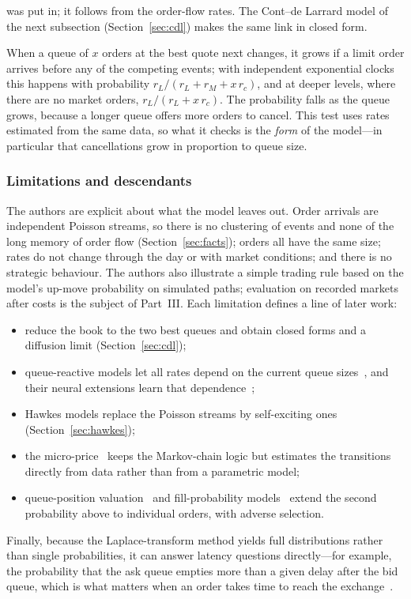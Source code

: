 \begin{description}[leftmargin=1.5em,style=nextline,itemsep=3pt]
  was put in; it follows from the order-flow rates. The Cont--de Larrard model of the next subsection
  (Section~\ref{sec:cdl}) makes the same link in closed form.
\item[One-step behaviour of queues] When a queue of $x$ orders at the best quote next changes, it grows if
  a limit order arrives before any of the competing events; with independent exponential clocks this
  happens with probability $r_L/(r_L + r_M + x\,r_c)$, and at deeper levels, where there are no market
  orders, $r_L/(r_L + x\,r_c)$. The probability falls as the queue grows, because a longer queue offers more
  orders to cancel. This test uses rates estimated from the same data, so what it
  checks is the \emph{form} of the model---in particular that cancellations grow in
  proportion to queue size.
\end{description}

\subsubsection{Limitations and descendants}

The authors are explicit about what the model leaves out. Order arrivals are independent Poisson
streams, so there is no clustering of events and none of the long memory of order flow
(Section~\ref{sec:facts}); orders all have the same size; rates do not change through the day or with
market conditions; and there is no strategic behaviour. The authors also illustrate a simple trading
rule based on the model's up-move probability on simulated paths; evaluation on recorded markets after
costs is the subject of Part~III. Each limitation defines a line of
later work:
\begin{itemize}[leftmargin=1.5em,itemsep=2pt]
\item \citet{contlarrard2013,contlarrard2012} reduce the book to the two best queues and obtain closed
  forms and a diffusion limit (Section~\ref{sec:cdl});
\item queue-reactive models let all rates depend on the current queue sizes~\citep{huang2015}, and their
  neural extensions learn that dependence~\citep{deepqr};
\item Hawkes models replace the Poisson streams by self-exciting ones (Section~\ref{sec:hawkes});
\item the micro-price~\citep{stoikov2018} keeps the Markov-chain logic but estimates the transitions
  directly from data rather than from a parametric model;
\item queue-position valuation~\citep{moallemi2017} and fill-probability models~\citep{arroyo2024,kanformer}
  extend the second probability above to individual orders, with adverse selection.
\end{itemize}
Finally, because the Laplace-transform method yields full distributions rather than single
probabilities, it can answer latency questions directly---for example, the probability that the ask
queue empties more than a given delay after the bid queue, which is what matters when an order takes
time to reach the exchange~\citep{cst2010}.


